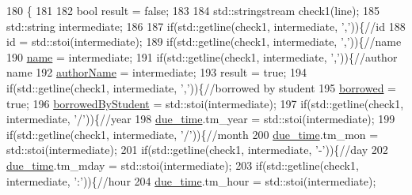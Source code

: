 \begin{DoxyCode}
180                                     \{
181 
182     \textcolor{keywordtype}{bool} result = \textcolor{keyword}{false};
183 
184     std::stringstream check1(line);
185     std::string intermediate;
186 
187     \textcolor{keywordflow}{if}(std::getline(check1, intermediate, \textcolor{charliteral}{','}))\{\textcolor{comment}{//id}
188         \textcolor{keywordtype}{id} =  std::stoi(intermediate);
189             \textcolor{keywordflow}{if}(std::getline(check1, intermediate, \textcolor{charliteral}{','}))\{\textcolor{comment}{//name}
190                 \hyperlink{classbook_a5eabc1c1c5abff26997bec3d41f90d9e}{name} = intermediate;
191                 \textcolor{keywordflow}{if}(std::getline(check1, intermediate, \textcolor{charliteral}{','}))\{\textcolor{comment}{//author name}
192                     \hyperlink{classbook_a21b2962c6227818732db27f12121b732}{authorName} = intermediate;
193                     result = \textcolor{keyword}{true};
194                     \textcolor{keywordflow}{if}(std::getline(check1, intermediate, \textcolor{charliteral}{','}))\{\textcolor{comment}{//borrowed by student}
195                         \hyperlink{classbook_ab745520ed537e69bde6f2e3d7a103276}{borrowed} = \textcolor{keyword}{true};
196                         \hyperlink{classbook_afa5350900be6a34d8301a57d6db54df5}{borrowedByStudent} =  std::stoi(intermediate);
197                         \textcolor{keywordflow}{if}(std::getline(check1, intermediate, \textcolor{charliteral}{'/'}))\{\textcolor{comment}{//year}
198                             \hyperlink{classbook_abf72d9a32cdadee632df5a626dbe33b8}{due\_time}.tm\_year =  std::stoi(intermediate);
199                             \textcolor{keywordflow}{if}(std::getline(check1, intermediate, \textcolor{charliteral}{'/'}))\{\textcolor{comment}{//month}
200                                 \hyperlink{classbook_abf72d9a32cdadee632df5a626dbe33b8}{due\_time}.tm\_mon =  std::stoi(intermediate);
201                                 \textcolor{keywordflow}{if}(std::getline(check1, intermediate, \textcolor{charliteral}{'-'}))\{\textcolor{comment}{//day}
202                                     \hyperlink{classbook_abf72d9a32cdadee632df5a626dbe33b8}{due\_time}.tm\_mday =  std::stoi(intermediate);
203                                     \textcolor{keywordflow}{if}(std::getline(check1, intermediate, \textcolor{charliteral}{':'}))\{\textcolor{comment}{//hour}
204                                         \hyperlink{classbook_abf72d9a32cdadee632df5a626dbe33b8}{due\_time}.tm\_hour =  std::stoi(intermediate);

\end{DoxyCode}
